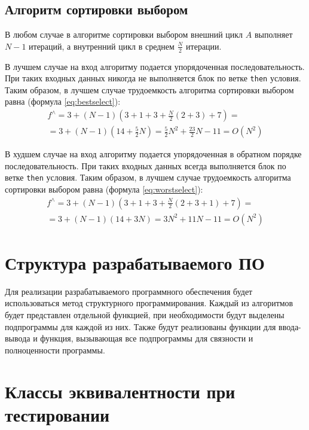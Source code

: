 \subsection{Алгоритм сортировки выбором}

В любом случае в алгоритме сортировки выбором внешний цикл $A$ выполняет
$N-1$ итераций, а внутренний цикл в среднем $\frac{N}{2}$ итерации.

В лучшем случае на вход алгоритму подается упорядоченная последовательность.
При таких входных данных никогда не выполняется блок по ветке \texttt{then}
условия. Таким образом, в лучшем случае трудоемкость алгоритма сортировки
выбором равна (формула \ref{eq:bestselect}):
    \begin{multline}\label{eq:bestselect}
        f^{\wedge} = 3 + (N - 1)(3 + 1 + 3 + \frac{N}{2}(2 + 3) + 7) = \\
                     = 3 + (N - 1)(14 + \frac{5}{2}N) =
                     \frac{5}{2}N^2 + \frac{23}{2}N - 11 = O(N^2)
    \end{multline}

В худшем случае на вход алгоритму подается упорядоченная в обратном порядке
последовательность. При таких входных данных всегда выполняется блок по
ветке \texttt{then} условия. Таким образом, в лучшем случае трудоемкость
алгоритма сортировки выбором равна (формула \ref{eq:worstselect}):
    \begin{multline}\label{eq:worstselect}
        f^{\wedge} = 3 + (N - 1)(3 + 1 + 3 + \frac{N}{2}(2 + 3 + 1) + 7) = \\
                     = 3 + (N - 1)(14 + 3N) =
                     3N^2 + 11N - 11 = O(N^2)
    \end{multline}


\section{Структура разрабатываемого ПО}

Для реализации разрабатываемого программного обеспечения будет использоваться
метод структурного программирования. Каждый из алгоритмов будет представлен
отдельной функцией, при необходимости будут выделены подпрограммы для каждой из
них. Также будут реализованы функции для ввода-вывода и функция, вызывающая все
подпрограммы для связности и полноценности программы.

\section{Классы эквивалентности при тестировании}


